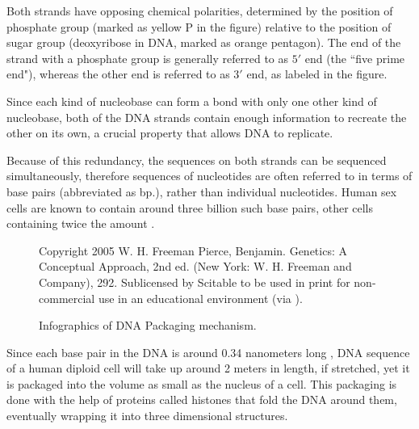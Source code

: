 \documentclass[parskip]{cs4rep}
\begin{document}
Both strands have opposing chemical polarities, determined by the position
of phosphate group (marked as yellow P in the figure) relative to the position of sugar group (deoxyribose in DNA, marked as orange pentagon). The end of the strand with a phosphate group is generally referred to as $5'$ end (the ``five prime end"), whereas the other end is referred to as $3'$ end, as labeled in the figure.

Since each kind of nucleobase can form a bond with only one other kind of
nucleobase, both of the DNA strands contain enough information to recreate the
other on its own, a crucial property that allows DNA to replicate. 

Because of this redundancy, the sequences on both strands can be sequenced simultaneously, therefore sequences of nucleotides are often referred to in terms of base pairs (abbreviated as bp.), rather than individual nucleotides. Human sex cells are known to contain around three billion such base pairs, other cells containing twice the amount \cite{Annunziato:2008wh}.

\begin{figure}[p]
   \centering
   {Copyright 2005 W. H. Freeman Pierce, Benjamin. Genetics: A Conceptual Approach, 2nd ed. (New York: W. H. Freeman and Company), 292. Sublicensed by Scitable to be used in print for non-commercial use in an educational environment (via \cite{Annunziato:2008wh}).}
   
   \caption{Infographics of DNA Packaging mechanism. }
   \label{fig:background:dna_packaging} 
\end{figure}

Since each base pair in the DNA is around 0.34 nanometers long \cite{Annunziato:2008wh},
DNA sequence of a human diploid cell will take up around 2 meters in length, if stretched, yet it is packaged into the volume as small as the nucleus of a cell. This packaging is done with the help of proteins called histones that fold the DNA around them, eventually wrapping it into three dimensional structures.
\end{document}
